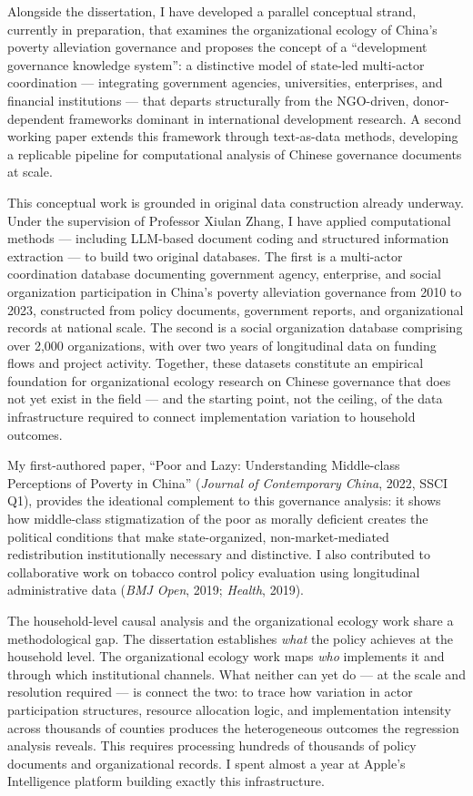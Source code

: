 \documentclass[11pt, letterpaper]{article}
\begin{document}
Alongside the dissertation, I have developed a parallel conceptual strand,
currently in preparation, that examines the organizational ecology of China's
poverty alleviation governance and proposes the concept of a ``development
governance knowledge system'': a distinctive model of state-led multi-actor
coordination --- integrating government agencies, universities, enterprises, and
financial institutions --- that departs structurally from the NGO-driven,
donor-dependent frameworks dominant in international development research. A
second working paper extends this framework through text-as-data methods,
developing a replicable pipeline for computational analysis of Chinese governance
documents at scale.

This conceptual work is grounded in original data construction already underway.
Under the supervision of Professor Xiulan Zhang, I have applied computational
methods --- including LLM-based document coding and structured information
extraction --- to build two original databases. The first is a multi-actor
coordination database documenting government agency, enterprise, and social
organization participation in China's poverty alleviation governance from 2010 to
2023, constructed from policy documents, government reports, and organizational
records at national scale. The second is a social organization database comprising
over 2,000 organizations, with over two years of longitudinal data on
funding flows and project activity. Together, these datasets constitute an
empirical foundation for organizational ecology research on Chinese governance that
does not yet exist in the field --- and the starting point, not the ceiling, of the
data infrastructure required to connect implementation variation to household
outcomes.

My first-authored paper, ``Poor and Lazy: Understanding Middle-class Perceptions of
Poverty in China'' (\textit{Journal of Contemporary China}, 2022, SSCI Q1), provides the
ideational complement to this governance analysis: it shows how middle-class
stigmatization of the poor as morally deficient creates the political conditions
that make state-organized, non-market-mediated redistribution institutionally
necessary and distinctive. I also contributed to collaborative work on tobacco
control policy evaluation using longitudinal administrative data (\textit{BMJ Open}, 2019;
\textit{Health}, 2019).

The household-level causal analysis and the organizational ecology work share a
methodological gap. The dissertation establishes \textit{what} the policy achieves at the
household level. The organizational ecology work maps \textit{who} implements it and
through which institutional channels. What neither can yet do --- at the scale and
resolution required --- is connect the two: to trace how variation in actor
participation structures, resource allocation logic, and implementation intensity
across thousands of counties produces the heterogeneous outcomes the regression
analysis reveals. This requires processing hundreds of thousands of policy
documents and organizational records. I spent almost a year at Apple's Intelligence
platform building exactly this infrastructure.
\end{document}
